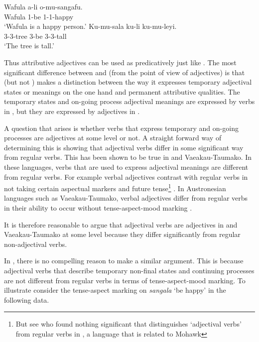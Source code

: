 \documentclass[output=paper,
modfonts
]{langscibook}
\begin{document}
\ea\label{ex:wasike:24}
\ea
\gll Wafula a-li o-mu-sangafu.\\
     Wafula 1-be 1-1-happy\\
\glt ‘Wafula is a happy person.’
\ex
\gll  Ku-mu-sala ku-li ku-mu-leyi.\\
     3-3-tree 3-be 3-3-tall\\
\glt ‘The tree is tall.’
\z
\z

Thus attributive adjectives can be used as predicatively just like . The most significant difference between  and  (from the point of view of adjectives) is that  (but not ) makes a distinction between the way it expresses temporary adjectival states or meanings on the one hand and permanent attributive qualities. The temporary states and on-going process adjectival meanings are expressed by verbs in , but they are expressed by adjectives in . 

A question that arises is whether verbs that express temporary and on-going processes are adjectives at some level or not. A straight forward way of determining this is showing that adjectival verbs differ in some significant way from regular verbs. This has been shown to be true in  and Vaeakau-Taumako. In these languages, verbs that are used to express adjectival meanings are different from regular verbs. For example  verbal adjectives contrast with regular verbs in not taking certain aspectual markers and future tense\footnote{But see \citet{Chafe2012} who found nothing significant that distinguishes ‘adjectival verbs’ from regular verbs in , a language that is related to Mohawk} \citep{Baker2001}. In Austronesian languages such as Vaeakau-Taumako, verbal adjectives differ from regular verbs in their ability to occur without tense-aspect-mood marking \citep{NaessHovdaugen2011}. 

It is therefore reasonable to argue that adjectival verbs are adjectives in  and Vaeakau-Taumako at some level because they differ significantly from regular non-adjectival verbs.

In , there is no compelling reason to make a similar argument. This is because adjectival verbs that describe temporary non-final states and continuing processes are not different from regular verbs in terms of tense-aspect-mood marking. To illustrate consider the tense-aspect marking on \textit{sangala} ‘be happy’ in the following data.
\end{document}
